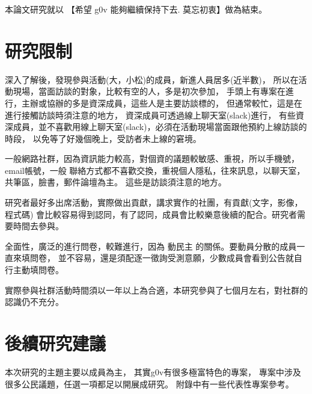本論文研究就以 【希望 g0v 能夠繼續保持下去. 莫忘初衷】做為結束。


\section{研究限制}

深入了解後，發現參與活動(大，小松)的成員，新進人員居多(近半數)，
所以在活動現場，當面訪談的對象，比較有空的人，多是初次參加，
手頭上有專案在進行，主辦或協辦的多是資深成員，這些人是主要訪談標的，
但通常較忙，這是在進行接觸訪談時須注意的地方，
資深成員可透過線上聊天室(slack)進行，
有些資深成員，並不喜歡用線上聊天室(slack)，必須在活動現場當面跟他預約上線訪談的時段，
以免等了好幾個晚上，受訪者未上線的窘境。

一般網路社群，因為資訊能力較高，對個資的議題較敏感、重視，所以手機號，email帳號，一般
聯絡方式都不喜歡交換，重視個人隱私，往來訊息，以聊天室，共筆區，臉書，郵件論壇為主。
這些是訪談須注意的地方。

研究者最好多出席活動，實際做出貢獻，講求實作的社團，有貢獻(文字，影像，程式碼)
會比較容易得到認同，有了認同，成員會比較樂意後續的配合。研究者需要時間去參與。

全面性，廣泛的進行問卷，較難進行，因為
動民主  \footnotemark[1] 的關係。要動員分散的成員一直來填問卷，
並不容易，還是須配逐一徵詢受測意願，少數成員會看到公告就自行主動填問卷。


實際參與社群活動時間須以一年以上為合適，本研究參與了七個月左右，對社群的認識仍不充分。


\section{後續研究建議}
本次研究的主題主要以成員為主，
其實g0v有很多極富特色的專案，
專案中涉及很多公民議題，任選一項都足以開展成研究。
附錄中有一些代表性專案參考。
